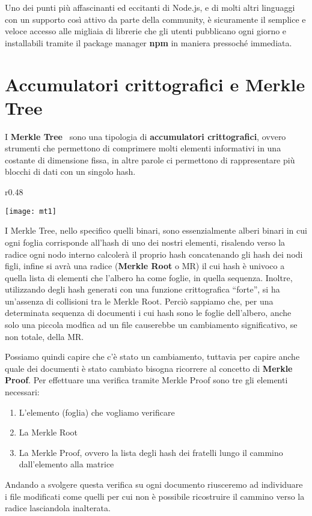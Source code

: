Uno dei punti più affascinanti ed eccitanti di Node.js, e di molti altri linguaggi
con un supporto così attivo da parte della community, è sicuramente il semplice e
veloce accesso alle migliaia di librerie che gli utenti pubblicano ogni giorno e
installabili tramite il package manager \textbf{npm} in maniera pressoché immediata.

\newpage

\section{Accumulatori crittografici e Merkle Tree}
\label{sub:mt}
I \textbf{Merkle Tree}~\cite{mertree} sono una tipologia di \textbf{accumulatori crittografici}, ovvero strumenti che permettono
di comprimere molti elementi informativi in una costante di dimensione fissa, in altre parole
ci permettono di rappresentare più blocchi di dati con un singolo hash.
\begin{wrapfigure}{r}{0.48\textwidth}
    \vspace{-20pt}
    \begin{center}
      \texttt{[image: mt1]}
    \end{center}
    \vspace{-20pt}
\end{wrapfigure}
I Merkle Tree, nello specifico quelli binari, sono essenzialmente alberi binari
in cui ogni foglia corrisponde all'hash di uno dei nostri elementi, risalendo verso la radice ogni
nodo interno calcolerà il proprio hash concatenando gli hash dei nodi figli, infine si avrà
una radice (\textbf{Merkle Root} o MR) il cui hash è univoco a quella lista di elementi che l'albero
ha come foglie, in quella sequenza.
Inoltre, utilizzando degli hash generati con una funzione crittografica “forte”, si ha
un'assenza di collisioni tra le Merkle Root.
Perciò sappiamo che, per una determinata sequenza di documenti i cui hash sono le foglie dell'albero, anche solo una
piccola modfica ad un file causerebbe un cambiamento significativo, se non totale, della MR.

Possiamo quindi capire che c'è stato un cambiamento, tuttavia per capire anche
quale dei documenti è stato cambiato bisogna ricorrere al concetto di \textbf{Merkle Proof}.
Per effettuare una verifica tramite Merkle Proof sono tre gli elementi necessari:
\begin{enumerate}
    \item L'elemento (foglia) che vogliamo verificare
    \item La Merkle Root
    \item La Merkle Proof, ovvero la lista degli hash dei fratelli lungo il cammino dall'elemento alla matrice
\end{enumerate}
Andando a svolgere questa verifica su ogni documento riusceremo ad individuare i file modificati come
quelli per cui non è possibile ricostruire il cammino verso la radice lasciandola inalterata.


